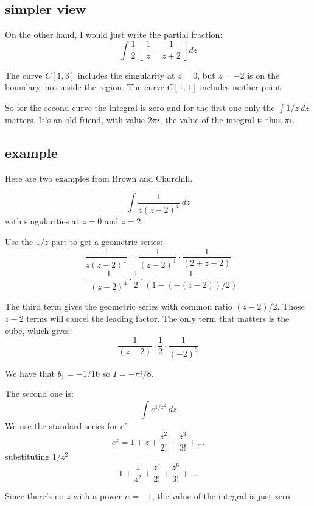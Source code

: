 \documentclass[11pt, oneside]{article}
\begin{document}
\subsection*{simpler view}

On the other hand, I would just write the partial fraction:
\[ \int \frac{1}{2} \ [ \ \frac{1}{z} - \frac{1}{z + 2} \ ] dz \]

The curve $C[1,3]$ includes the singularity at $z = 0$, but $z = -2$ is on the boundary, not inside the region.  The curve $C[1,1]$ includes neither point.

So for the second curve the integral is zero and for the first one only the $\int 1/z \ dz$ matters.  It's an old friend, with value $2 \pi i$, the value of the integral is thus $\pi i$.

\subsection*{example}

Here are two examples from Brown and Churchill.

\[ \int \frac{1}{z(z-2)^4} \ dz \]
with singularities at $z = 0$ and $z = 2$.

Use the $1/z$ part to get a geometric series:
\[ \frac{1}{z(z-2)^4} = \frac{1}{(z-2)^4} \cdot \frac{1}{(2 + z - 2)} \]
\[ = \frac{1}{(z-2)^4} \cdot \frac{1}{2} \cdot \frac{1}{(1 - (-(z-2))/2 )} \]

The third term gives the geometric series with common ratio $(z-2)/2$.  Those $z-2$ terms will cancel the leading factor.  The only term that matters is the cube, which gives:
\[  \frac{1}{(z-2)} \cdot \frac{1}{2} \cdot \frac{1}{(-2)^3} \]

We have that $b_1 = -1/16$ so $I = -\pi i/8$.

The second one is:
\[ \int e^{1/z^2} \ dz \]
We use the standard series for $e^z$
\[ e^z = 1 + z + \frac{z^2}{2!} + \frac{z^3}{3!} + \dots \]
substituting $1/z^2$
\[ 1 + \frac{1}{z^2} + \frac{z^r}{2!} + \frac{z^6}{3!} + \dots \]

Since there's no $z$ with a power $n=-1$, the value of the integral is just zero.
\end{document}
